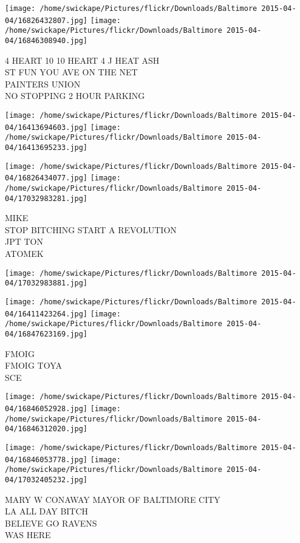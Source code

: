 \documentclass[10pt,letterpaper]{article}
\begin{document}
\texttt{[image: /home/swickape/Pictures/flickr/Downloads/Baltimore 2015-04-04/16826432807.jpg]}
\texttt{[image: /home/swickape/Pictures/flickr/Downloads/Baltimore 2015-04-04/16846308940.jpg]}

4 HEART 10 10 HEART 4 J HEAT ASH\\
ST FUN YOU AVE ON THE NET\\
PAINTERS UNION\\
NO STOPPING 2 HOUR PARKING\\
\pagebreak

\texttt{[image: /home/swickape/Pictures/flickr/Downloads/Baltimore 2015-04-04/16413694603.jpg]}
\texttt{[image: /home/swickape/Pictures/flickr/Downloads/Baltimore 2015-04-04/16413695233.jpg]}

\texttt{[image: /home/swickape/Pictures/flickr/Downloads/Baltimore 2015-04-04/16826434077.jpg]}
\texttt{[image: /home/swickape/Pictures/flickr/Downloads/Baltimore 2015-04-04/17032983281.jpg]}

MIKE\\
STOP BITCHING START A REVOLUTION\\
JPT TON\\
ATOMEK\\
\pagebreak

\texttt{[image: /home/swickape/Pictures/flickr/Downloads/Baltimore 2015-04-04/17032983881.jpg]}

\vspace{0.25in}
\texttt{[image: /home/swickape/Pictures/flickr/Downloads/Baltimore 2015-04-04/16411423264.jpg]}
\texttt{[image: /home/swickape/Pictures/flickr/Downloads/Baltimore 2015-04-04/16847623169.jpg]}

FMOIG\\
FMOIG TOYA\\
SCE\\
\pagebreak

\texttt{[image: /home/swickape/Pictures/flickr/Downloads/Baltimore 2015-04-04/16846052928.jpg]}
\texttt{[image: /home/swickape/Pictures/flickr/Downloads/Baltimore 2015-04-04/16846312020.jpg]}

\texttt{[image: /home/swickape/Pictures/flickr/Downloads/Baltimore 2015-04-04/16846053778.jpg]}
\texttt{[image: /home/swickape/Pictures/flickr/Downloads/Baltimore 2015-04-04/17032405232.jpg]}

MARY W CONAWAY MAYOR OF BALTIMORE CITY\\
LA ALL DAY BITCH\\
BELIEVE GO RAVENS\\
WAS HERE\\
\pagebreak
\end{document}
